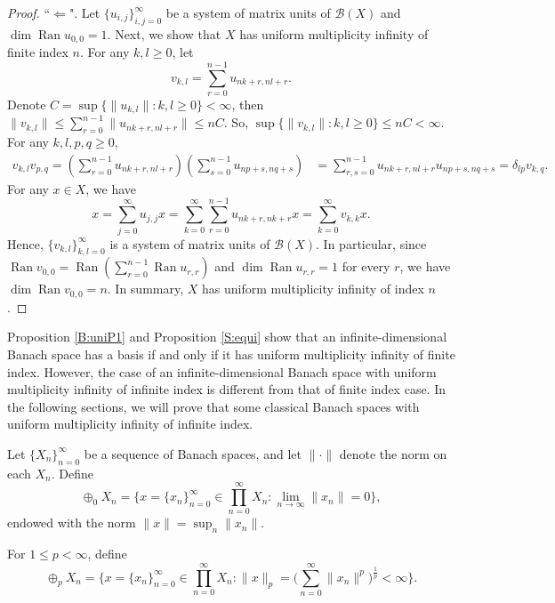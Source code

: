 \documentclass[12pt]{amsart}
\numberwithin{equation}{section}
\theoremstyle{plain}
\theoremstyle{definition}
\newcommand{\B}{{\mathcal{B}}}
\newcommand{\ran}{\operatorname{Ran}}
\begin{document}
\begin{proof}
``$\Leftarrow$".
Let $\{u_{i,j}\}_{i,j=0}^{\infty}$ be a system of matrix units of $\B(X)$ and $\dim\ran u_{0,0}=1$.
Next, we show that $X$ has uniform multiplicity infinity of finite index $n$.
For any $k,l\geq 0$, let
$$v_{k,l}=\sum_{r=0}^{n-1}u_{nk+r,nl+r}.$$
Denote $C=\sup\{\|u_{k,l}\|:k,l\geq 0\}<\infty$, then $\|v_{k,l}\|\leq\sum_{r=0}^{n-1}\|u_{nk+r,nl+r}\|\leq nC$.
So, $\sup\{\|v_{k,l}\|:k,l\geq 0\}\leq nC<\infty$.
For any $k,l,p,q\geq 0$,
\begin{align*}
v_{k,l}v_{p,q}=\left(\sum_{r=0}^{n-1}u_{nk+r,nl+r}\right)\left(\sum_{s=0}^{n-1}u_{np+s,nq+s}\right)
&=\sum_{r,s=0}^{n-1}u_{nk+r,nl+r}u_{np+s,nq+s}=\delta_{lp}v_{k,q}.
\end{align*}
For any $x\in X$,
we have
$$x=\sum_{j=0}^{\infty}u_{j,j}x=\sum_{k=0}^{\infty}\sum_{r=0}^{n-1}u_{nk+r,nk+r}x=\sum_{k=0}^{\infty}v_{k,k}x.$$
Hence,
$\{v_{k,l}\}_{k,l=0}^{\infty}$ is a system of matrix units of $\B(X)$.
In particular,
since $\ran v_{0,0}=\ran \left(\sum_{r=0}^{n-1}\ran u_{r,r}\right)$ and $\dim\ran u_{r,r}=1$ for every $r$, we have $\dim\ran v_{0,0}=n$.
In summary, $X$ has uniform multiplicity infinity of index $n$.
\end{proof}

Proposition \ref{B:uniP1} and Proposition \ref{S:equi} show that an infinite-dimensional Banach space has a basis if and only if it has uniform multiplicity infinity of finite index.
However, the case of an infinite-dimensional Banach space with uniform multiplicity infinity of infinite index is different from that of finite index case.
In the following sections, we will prove that some classical Banach spaces with uniform multiplicity infinity of infinite index.

Let $\{X_n\}_{n=0}^{\infty}$ be a sequence of Banach spaces, and let $\|\cdot\|$ denote the norm on each $X_n$.
Define
$$\oplus_{0} X_n=\{x=\{x_n\}_{n=0}^{\infty}\in\prod_{n=0}^{\infty}X_n:\lim_{n\rightarrow \infty }\|x_n\|=0\},$$
endowed with the norm $\|x\|=\sup_{n}\|x_n\|$.

For $1\leq p<\infty$, define
$$\oplus_{p} X_n=\{x=\{x_n\}_{n=0}^{\infty}\in\prod_{n=0}^{\infty}X_n:\|x\|_p=\big(\sum_{n=0}^{\infty}\|x_n\|^p\big)^{\frac{1}{p}}<\infty\}.$$
\end{document}
